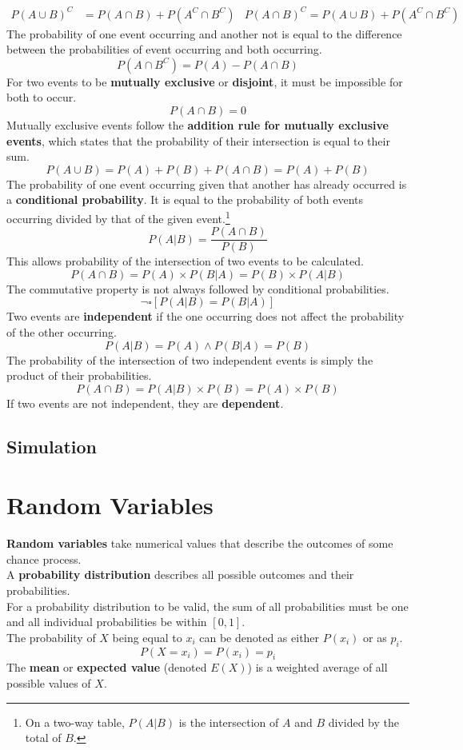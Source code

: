 \documentclass[../AP_Statistics.tex]{subfiles}
\begin{document}
		\begin{align*}
			P(A\cup B)^C &= P(A\cap B) + P\left(A^C\cap B^C\right)	& P(A\cap B)^C = P(A\cup B) + P\left(A^C \cap B^C\right)
			\end{align*}
		The probability of one event occurring and another not is equal to the difference between the probabilities of event occurring and both occurring.
		\[P\left(A\cap B^C\right) = P(A) - P(A\cap B)\]
		For two events to be \textbf{mutually exclusive} or \textbf{disjoint}, it must be impossible for both to occur.
		\[P(A\cap B) = 0\]
		Mutually exclusive events follow the \textbf{addition rule for mutually exclusive events}, which states that the probability of their intersection is equal to their sum.
		\[P(A\cup B) = P(A) + P(B) + P(A\cap B) = P(A) + P(B)\]
		The probability of one event occurring given that another has already occurred is a \textbf{conditional probability}. It is equal to the probability of both events occurring divided by that of the given event.\footnote{On a two-way table, $P(A|B)$ is the intersection of $A$ and $B$ divided by the total of $B$.}
		\[P(A|B) = \frac{P(A\cap B)}{P(B)}\]
		This allows probability of the intersection of two events to be calculated.
		\[P(A\cap B) = P(A) \times P(B|A) = P(B) \times P(A|B)\]
		The commutative property is not always followed by conditional probabilities.
		\[\lnot\square[P(A|B) = P(B|A)]\]
		Two events are \textbf{independent} if the one occurring does not affect the probability of the other occurring.
		\[P(A|B) = P(A) \land P(B|A) = P(B)\]
		The probability of the intersection of two independent events is simply the product of their probabilities.
		\[P(A\cap B) = P(A|B) \times P(B) = P(A) \times P(B)\]
		If two events are not independent, they are \textbf{dependent}.
		\section*{Simulation}
	\chapter{Random Variables}
		\textbf{Random variables} take numerical values that describe the outcomes of some chance process. \\
		A \textbf{probability distribution} describes all possible outcomes and their probabilities. \\
		For a probability distribution to be valid, the sum of all probabilities must be one and all individual probabilities be within $[0,1]$. \\
		The probability of $X$ being equal to $x_i$ can be denoted as either $P(x_i)$ or as $p_i$.
		\[P(X = x_i) = P(x_i) = p_i\]
		The \textbf{mean} or \textbf{expected value} (denoted $E(X)$) is a weighted average of all possible values of $X$.
\end{document}
